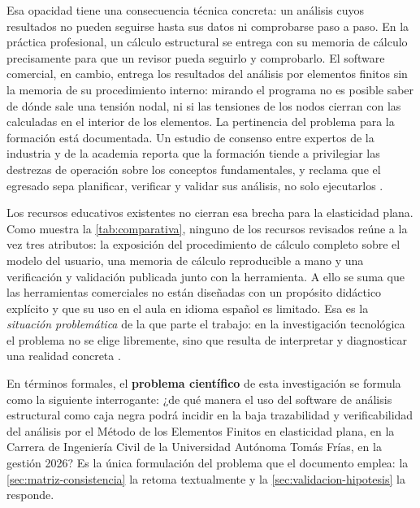 Esa opacidad tiene una consecuencia técnica concreta: un análisis cuyos resultados no pueden seguirse hasta sus datos ni comprobarse paso a paso. En la práctica profesional, un cálculo estructural se entrega con su memoria de cálculo precisamente para que un revisor pueda seguirlo y comprobarlo. El software comercial, en cambio, entrega los resultados del análisis por elementos finitos sin la memoria de su procedimiento interno: mirando el programa no es posible saber de dónde sale una tensión nodal, ni si las tensiones de los nodos cierran con las calculadas en el interior de los elementos. La pertinencia del problema para la formación está documentada. Un estudio de consenso entre expertos de la industria y de la academia reporta que la formación tiende a privilegiar las destrezas de operación sobre los conceptos fundamentales, y reclama que el egresado sepa planificar, verificar y validar sus análisis, no solo ejecutarlos \autocite[pp.~1159, 1171]{perezsantiago2023fem}.

Los recursos educativos existentes no cierran esa brecha para la elasticidad plana. Como muestra la \autoref{tab:comparativa}, ninguno de los recursos revisados reúne a la vez tres atributos: la exposición del procedimiento de cálculo completo sobre el modelo del usuario, una memoria de cálculo reproducible a mano y una verificación y validación publicada junto con la herramienta. A ello se suma que las herramientas comerciales no están diseñadas con un propósito didáctico explícito \autocite[p.~1160]{perezsantiago2023fem} y que su uso en el aula en idioma español es limitado. Esa es la \emph{situación problemática} de la que parte el trabajo: en la investigación tecnológica el problema no se elige libremente, sino que resulta de interpretar y diagnosticar una realidad concreta \autocite[p.~83]{garciacordoba2005tecnologica}.

En términos formales, el \textbf{problema científico} de esta investigación se formula como la siguiente interrogante: ¿de qué manera el uso del software de análisis estructural como caja negra podrá incidir en la baja trazabilidad y verificabilidad del análisis por el Método de los Elementos Finitos en elasticidad plana, en la Carrera de Ingeniería Civil de la Universidad Autónoma Tomás Frías, en la gestión 2026? Es la única formulación del problema que el documento emplea: la \autoref{sec:matriz-consistencia} la retoma textualmente y la \autoref{sec:validacion-hipotesis} la responde.

